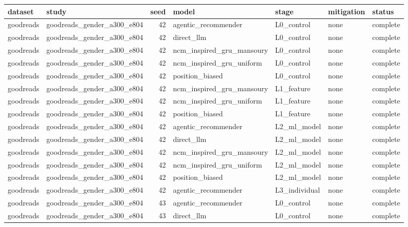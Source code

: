 \begin{table}[htbp!]
\centering
\small
\setlength{\tabcolsep}{3pt}
\renewcommand{\arraystretch}{1.1}
\begin{tabular}{llrllll}
\hline
dataset & study & seed & model & stage & mitigation & status \\
\hline
goodreads & goodreads\_gender\_a300\_e804 & 42 & agentic\_recommender & L0\_control & none & complete \\
goodreads & goodreads\_gender\_a300\_e804 & 42 & direct\_llm & L0\_control & none & complete \\
goodreads & goodreads\_gender\_a300\_e804 & 42 & ncm\_inspired\_gru\_mansoury & L0\_control & none & complete \\
goodreads & goodreads\_gender\_a300\_e804 & 42 & ncm\_inspired\_gru\_uniform & L0\_control & none & complete \\
goodreads & goodreads\_gender\_a300\_e804 & 42 & position\_biased & L0\_control & none & complete \\
goodreads & goodreads\_gender\_a300\_e804 & 42 & ncm\_inspired\_gru\_mansoury & L1\_feature & none & complete \\
goodreads & goodreads\_gender\_a300\_e804 & 42 & ncm\_inspired\_gru\_uniform & L1\_feature & none & complete \\
goodreads & goodreads\_gender\_a300\_e804 & 42 & position\_biased & L1\_feature & none & complete \\
goodreads & goodreads\_gender\_a300\_e804 & 42 & agentic\_recommender & L2\_ml\_model & none & complete \\
goodreads & goodreads\_gender\_a300\_e804 & 42 & direct\_llm & L2\_ml\_model & none & complete \\
goodreads & goodreads\_gender\_a300\_e804 & 42 & ncm\_inspired\_gru\_mansoury & L2\_ml\_model & none & complete \\
goodreads & goodreads\_gender\_a300\_e804 & 42 & ncm\_inspired\_gru\_uniform & L2\_ml\_model & none & complete \\
goodreads & goodreads\_gender\_a300\_e804 & 42 & position\_biased & L2\_ml\_model & none & complete \\
goodreads & goodreads\_gender\_a300\_e804 & 42 & agentic\_recommender & L3\_individual & none & complete \\
goodreads & goodreads\_gender\_a300\_e804 & 43 & agentic\_recommender & L0\_control & none & complete \\
goodreads & goodreads\_gender\_a300\_e804 & 43 & direct\_llm & L0\_control & none & complete \\

\end{tabular}
\end{table}
